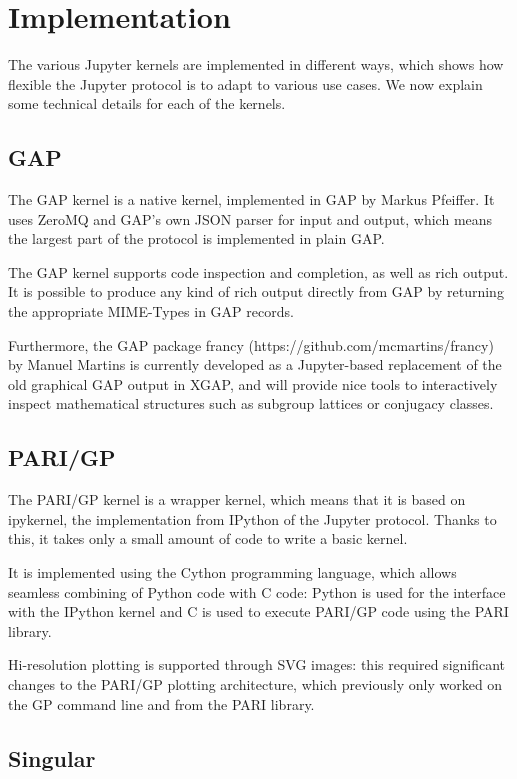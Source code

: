 \documentclass{deliverablereport}
\begin{document}
\section{Implementation}

The various Jupyter kernels are implemented in different ways, which shows how flexible
the Jupyter protocol is to adapt to various use cases. We now explain some technical details for each of the kernels.

\subsection{GAP}

The GAP kernel is a native kernel, implemented in GAP by Markus Pfeiffer. It uses ZeroMQ and GAP's own JSON
parser for input and output, which means the largest part of the protocol is implemented in plain GAP.

The GAP kernel supports code inspection and completion, as well as rich output. It is possible to produce
any kind of rich output directly from GAP by returning the appropriate MIME-Types in GAP records.

Furthermore, the GAP package francy (https://github.com/mcmartins/francy) by Manuel Martins is
currently developed as a Jupyter-based replacement of the old graphical GAP output in XGAP,
and will provide nice tools to interactively inspect mathematical structures such as subgroup lattices
or conjugacy classes.


\subsection{PARI/GP}

The PARI/GP kernel is a wrapper kernel, which means that it is based on ipykernel, the implementation from IPython of the Jupyter protocol.
Thanks to this, it takes only a small amount of code to write a basic kernel.

It is implemented using the Cython programming language,
which allows seamless combining of Python code with C code:
Python is used for the interface with the IPython kernel and C is used to execute PARI/GP code
using the PARI library.

Hi-resolution plotting is supported through SVG images: this required significant changes to the PARI/GP
plotting architecture, which previously only worked on the GP command line and from the PARI library.

\subsection{Singular}
\end{document}
